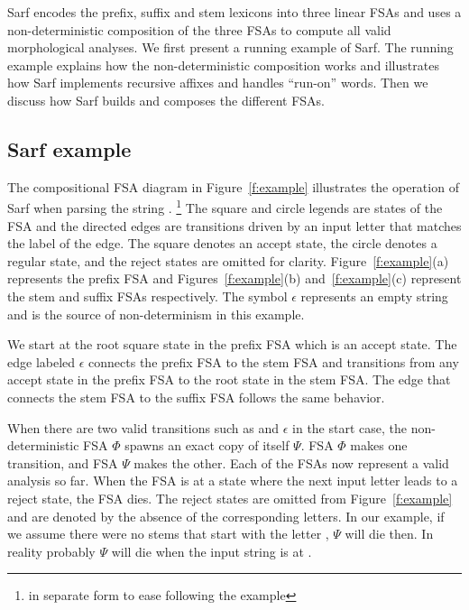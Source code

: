 \documentclass[11pt,letterpaper]{article}
\begin{document}
Sarf encodes the prefix, suffix and stem lexicons into 
three linear FSAs and uses a non-deterministic composition
of the three FSAs to compute all valid morphological analyses.
We first present a running example of Sarf. 
The running example explains
how the non-deterministic composition works and 
illustrates how Sarf implements recursive affixes and
handles ``run-on'' words.
Then we discuss how Sarf builds and composes the different FSAs.

\subsection{Sarf example}
\label{sec:example}

\transfalse
\begin{figure*}[tb]
\end{figure*}
\transtrue

The compositional FSA diagram in Figure~\ref{f:example}
illustrates the operation of Sarf when parsing the
string .
\footnote{ 
%
in separate form to ease following the example
}
The square and circle legends are states of the FSA
and the directed edges are transitions driven by an input
letter that matches the label of the edge. 
The square denotes an accept state, 
the circle denotes a regular state, and the reject states
are omitted for clarity. 
Figure~\ref{f:example}(a) represents the prefix FSA and 
Figures~\ref{f:example}(b) and~\ref{f:example}(c) represent the 
stem and suffix FSAs respectively. 
The symbol $\epsilon$ represents an empty string and is 
the source of non-determinism in this example. 

We start at the root square state in the prefix FSA
which is an accept state. 
The edge labeled $\epsilon$ connects the prefix 
FSA to the stem FSA and transitions from any accept state
in the prefix FSA to the root state in the stem FSA.
The edge that connects the stem FSA to the suffix FSA
follows the same behavior. 

When there are two valid transitions such as  
and $\epsilon$ in the start case, the non-deterministic 
FSA $\Phi$ spawns an exact copy of itself $\Psi$. FSA $\Phi$
makes one transition, and FSA $\Psi$ makes the other. 
Each of the FSAs now represent a valid analysis so far. 
When the FSA is at a state where the next input letter
leads to a reject state, the FSA dies.
The reject states are omitted from Figure~\ref{f:example}
and are denoted by the absence of the corresponding 
letters. 
In our example, if we assume there were no stems that start 
with the letter , $\Psi$ will die then. 
In reality probably $\Psi$ will die when the input string
is at . 
\end{document}
